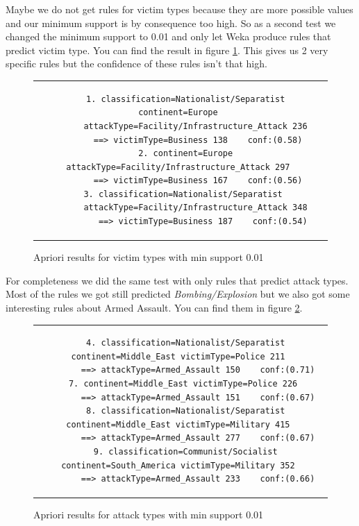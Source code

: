 \documentclass[a4]{article}
\begin{document}
Maybe we do not get rules for victim types because they are more possible values and our minimum support is by consequence too high. So as a second test we changed the minimum support to 0.01 and only let Weka produce rules that predict victim type. You can find the result in figure \ref{fig:apriori_21}. This gives us 2 very specific rules but the confidence of these rules isn't that high.
\begin{figure}[!h]
\begin{tabular}{c}
\begin{lstlisting}
  1. classification=Nationalist/Separatist continent=Europe 
      attackType=Facility/Infrastructure_Attack 236
       ==> victimType=Business 138    conf:(0.58)
  2. continent=Europe attackType=Facility/Infrastructure_Attack 297 
       ==> victimType=Business 167    conf:(0.56)
  3. classification=Nationalist/Separatist 
       attackType=Facility/Infrastructure_Attack 348 
         ==> victimType=Business 187    conf:(0.54)
\end{lstlisting}
\end{tabular}
\caption{Apriori results for victim types with min support 0.01}
\label{fig:apriori_21}
\end{figure}
For completeness we did the same test with only rules that predict attack types. Most of the rules we got still predicted \textit{Bombing/Explosion} but we also got some interesting rules about Armed Assault. You can find them in figure \ref{fig:apriori_22}.
\begin{figure}[!h]
\begin{tabular}{c}
\begin{lstlisting}
  4. classification=Nationalist/Separatist continent=Middle_East victimType=Police 211 
       ==> attackType=Armed_Assault 150    conf:(0.71)
  7. continent=Middle_East victimType=Police 226 
       ==> attackType=Armed_Assault 151    conf:(0.67)
  8. classification=Nationalist/Separatist continent=Middle_East victimType=Military 415 
       ==> attackType=Armed_Assault 277    conf:(0.67)
  9. classification=Communist/Socialist continent=South_America victimType=Military 352 
       ==> attackType=Armed_Assault 233    conf:(0.66)
\end{lstlisting}
\end{tabular}
\caption{Apriori results for attack types with min support 0.01}
\label{fig:apriori_22}
\end{figure}
\end{document}
